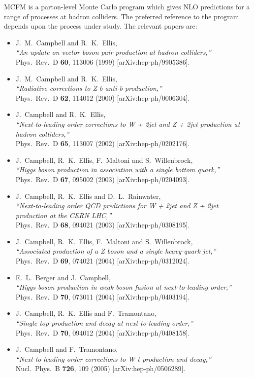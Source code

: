 \documentclass[12pt]{article}
\begin{document}
MCFM is a parton-level Monte Carlo program which gives NLO predictions
for a range of processes at hadron colliders. The preferred reference
to the program depends upon the process under study. The relevant papers
are:
\begin{itemize}
\item J.~M.~Campbell and R.~K.~Ellis, \\
  {\it ``An update on vector boson pair production at hadron colliders,''} \\
  Phys.\ Rev.\ D {\bf 60}, 113006 (1999)
  [arXiv:hep-ph/9905386].
\item J.~M.~Campbell and R.~K.~Ellis, \\
  {\it ``Radiative corrections to Z b anti-b production,''} \\
  Phys.\ Rev.\ D {\bf 62}, 114012 (2000)
  [arXiv:hep-ph/0006304].
\item J.~Campbell and R.~K.~Ellis, \\
  {\it ``Next-to-leading order corrections to W + 2jet and Z + 2jet production  at
   hadron colliders,''} \\
  Phys.\ Rev.\ D {\bf 65}, 113007 (2002)
  [arXiv:hep-ph/0202176].
\item J.~Campbell, R.~K.~Ellis, F.~Maltoni and S.~Willenbrock, \\
  {\it ``Higgs boson production in association with a single bottom quark,''} \\
  Phys.\ Rev.\ D {\bf 67}, 095002 (2003)
  [arXiv:hep-ph/0204093].
\item J.~Campbell, R.~K.~Ellis and D.~L.~Rainwater, \\
  {\it ``Next-to-leading order QCD predictions for W + 2jet and Z + 2jet  production
     at the CERN LHC,''} \\
  Phys.\ Rev.\ D {\bf 68}, 094021 (2003)
  [arXiv:hep-ph/0308195].
\item J.~Campbell, R.~K.~Ellis, F.~Maltoni and S.~Willenbrock, \\
  {\it ``Associated production of a Z boson and a single heavy-quark jet,''} \\
  Phys.\ Rev.\ D {\bf 69}, 074021 (2004)
  [arXiv:hep-ph/0312024].
\item E.~L.~Berger and J.~Campbell, \\
  {\it ``Higgs boson production in weak boson fusion at next-to-leading order,''} \\
  Phys.\ Rev.\ D {\bf 70}, 073011 (2004)
  [arXiv:hep-ph/0403194].
\item J.~Campbell, R.~K.~Ellis and F.~Tramontano, \\
  {\it ``Single top production and decay at next-to-leading order,''} \\
  Phys.\ Rev.\ D {\bf 70}, 094012 (2004)
  [arXiv:hep-ph/0408158].
\item J.~Campbell and F.~Tramontano, \\
  {\it ``Next-to-leading order corrections to W t production and
  decay,''} \\
  Nucl.\ Phys.\ B {\bf 726}, 109 (2005)
  [arXiv:hep-ph/0506289].
\end{itemize}
\end{document}
